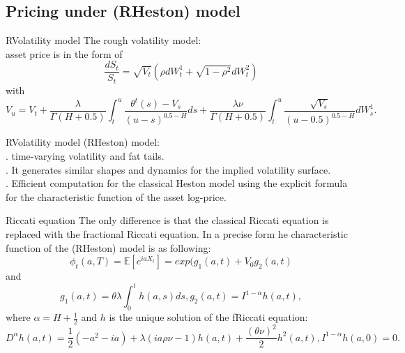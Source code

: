 \subsection{Pricing under (RHeston) model}
            \begin{frame}{RVolatility model}
                The rough volatility model:\\
                asset price is in the form of\\
                $$\frac{dS_t}{S_t} = \sqrt{V_t}(\rho dW_t^1 + \sqrt{1 - \rho^2}dW_t^2)$$
                with
                $$V_u = V_t + \frac{\lambda}{\Gamma(H + 0.5)}\int_{t}^{u}\frac{\theta^t(s) - V_s}{(u - s)^{0.5 - H}} ds + \frac{\lambda \nu}{\Gamma(H + 0.5)}\int_{t}^{u}\frac{\sqrt{V_s}}{(u - 0.5)^{0.5 - H}} dW_s^1.$$
            \end{frame}
            \begin{frame}{RVolatility model}
                (RHeston) model:\\
                \>\>.	time-varying volatility and fat tails.\\
                \>\>.	It generates similar shapes and dynamics for the implied volatility surface.\\ 
                \>\>.	Efficient computation for the classical Heston model using the explicit formula for the characteristic function of the asset log-price.\\
            \end{frame}
            \begin{frame}{Riccati equation}
                \>\>\>The only difference is that the classical Riccati equation is replaced with the fractional Riccati equation. In a precise form he characteristic function of the (RHeston) model is as following:\\
                $$\phi_t(a, T) = \mathbb{E}[e^{iaX_t}] = exp(g_1(a, t) + V_0g_2(a, t)$$
                and
                $$g_1(a, t) = \theta \lambda \int_{0}^{t} h(a, s) ds, g_2(a, t) = I^{1 - \alpha} h(a, t),$$
                where $\alpha = H + \frac{1}{2}$ and $h$ is the unique solution of the fRiccati equation:\\
                $$D^{\alpha}h(a, t) = \frac{1}{2}(-a^2 - ia) + \lambda(ia\rho\nu - 1)h(a, t) + \frac{(\theta\nu)^2}{2}h^2(a, t), I^{1 - \alpha}h(a, 0) = 0.$$
            \end{frame}

